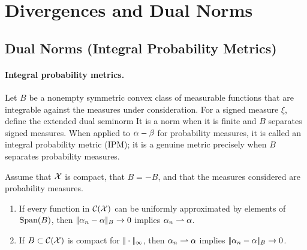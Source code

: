 \section{Divergences and Dual Norms}
\label{sec-divergences-dual-norms}
\subsection{Dual Norms (Integral Probability Metrics)}
\label{sec-dual-norms}
\paragraph{Integral probability metrics.}
\begin{defn}\label{def-dual-norm-ipm}
Let $B$ be a nonempty symmetric convex class of measurable functions that are integrable against the measures under consideration. For a signed measure $\xi$, define the extended dual seminorm
It is a norm when it is finite and $B$ separates signed measures. When applied to $\alpha-\beta$ for probability measures, it is called an integral probability metric (IPM); it is a genuine metric precisely when $B$ separates probability measures.
\end{defn}
\begin{prop}\label{prop-dual-norm-metrization}
Assume that $\mathcal{X}$ is compact, that $B=-B$, and that the measures considered are probability measures.
\begin{enumerate}
\item If every function in $\mathcal{C}(\mathcal{X})$ can be uniformly approximated by elements of $\operatorname{Span}(B)$, then $|\!| \alpha_n-\alpha |\!|_B \rightarrow 0$ implies $\alpha_n \rightharpoonup \alpha$.
\item If $B \subset \mathcal{C}(\mathcal{X})$ is compact for $|\!| \cdot |\!|_\infty$, then $\alpha_n \rightharpoonup \alpha$ implies $|\!| \alpha_n-\alpha |\!|_B \rightarrow 0$.
\end{enumerate}
\end{prop}
